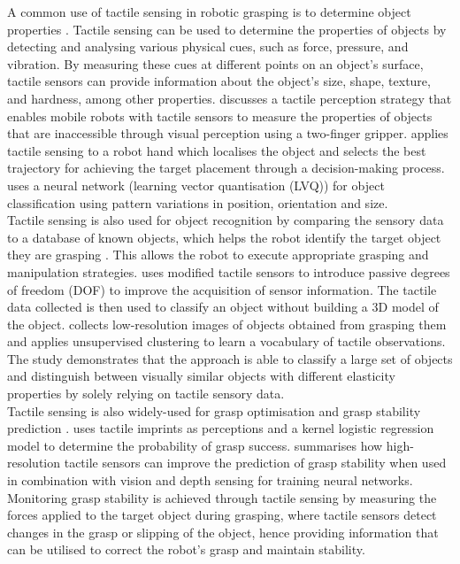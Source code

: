 \documentclass[11pt, a4paper]{report}
\begin{document}
A common use of tactile sensing in robotic grasping is to determine object properties \cite{chitta2010, hsiao2010, JIMENEZ1997488}. Tactile sensing can be used to determine the properties of objects by detecting and analysing various physical cues, such as force, pressure, and vibration. By measuring these cues at different points on an object's surface, tactile sensors can provide information about the object's size, shape, texture, and hardness, among other properties. \cite{chitta2010} discusses a tactile perception strategy that enables mobile robots with tactile sensors to measure the properties of objects that are inaccessible through visual perception using a two-finger gripper. \cite{hsiao2010} applies tactile sensing to a robot hand which localises the object and selects the best trajectory for achieving the target placement through a decision-making process. \cite{JIMENEZ1997488} uses a neural network (learning vector quantisation (LVQ)) for object classification using pattern variations in position, orientation and size.\\

Tactile sensing is also used for object recognition by comparing the sensory data to a database of known objects, which helps the robot identify the target object they are grasping \cite{5652597, gorges2010, schneider2009}. This allows the robot to execute appropriate grasping and manipulation strategies. \cite{gorges2010} uses modified tactile sensors to introduce passive degrees of freedom (DOF) to improve the acquisition of sensor information. The tactile data collected is then used to classify an object without building a 3D model of the object. \cite{schneider2009} collects low-resolution images of objects obtained from grasping them and applies unsupervised clustering to learn a vocabulary of tactile observations. The study demonstrates that the approach is able to classify a large set of objects and distinguish between visually similar objects with different elasticity properties by solely relying on tactile sensory data.\\

Tactile sensing is also widely-used for grasp optimisation and grasp stability prediction \cite{6094878, chumbley2022integrating, de_Farias_2021, Lambeta2020DIGIT, liu2022gelsight}. \cite{6094878} uses tactile imprints as perceptions and a kernel logistic regression model to determine the probability of grasp success. \cite{chumbley2022integrating} summarises how high-resolution tactile sensors can improve the prediction of grasp stability when used in combination with vision and depth sensing for training neural networks. Monitoring grasp stability \cite{Bekiroglu2012LearningTA, Chebotar_2017, garciagarcia2019tactilegcn, GUO2017274} is achieved through tactile sensing by measuring the forces applied to the target object during grasping, where tactile sensors detect changes in the grasp or slipping of the object, hence providing information that can be utilised to correct the robot's grasp and maintain stability.
\end{document}
